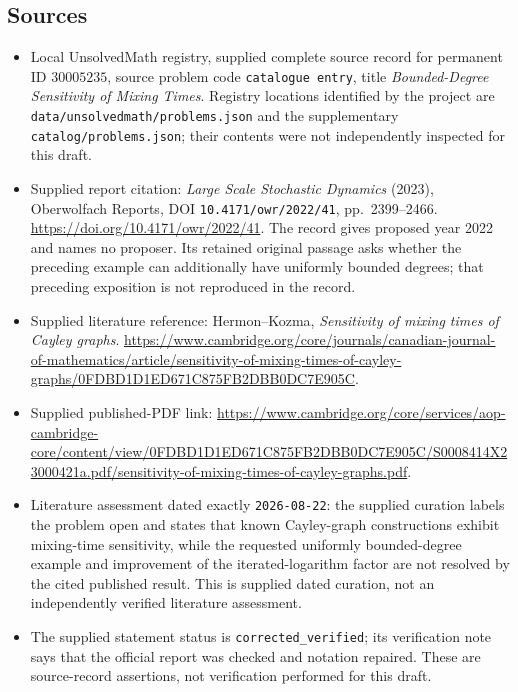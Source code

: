 \documentclass[11pt]{article}
\begin{document}
\subsection{Sources}
\begin{itemize}
\item Local UnsolvedMath registry, supplied complete source record for permanent ID \(30005235\), source problem code \texttt{catalogue entry}, title \emph{Bounded-Degree Sensitivity of Mixing Times}. Registry locations identified by the project are \texttt{data/unsolvedmath/problems.json} and the supplementary \texttt{catalog/problems.json}; their contents were not independently inspected for this draft.
\item Supplied report citation: \emph{Large Scale Stochastic Dynamics} (2023), Oberwolfach Reports, DOI \texttt{10.4171/owr/2022/41}, pp.\ 2399--2466. \url{https://doi.org/10.4171/owr/2022/41}. The record gives proposed year 2022 and names no proposer. Its retained original passage asks whether the preceding example can additionally have uniformly bounded degrees; that preceding exposition is not reproduced in the record.
\item Supplied literature reference: Hermon--Kozma, \emph{Sensitivity of mixing times of Cayley graphs}. \url{https://www.cambridge.org/core/journals/canadian-journal-of-mathematics/article/sensitivity-of-mixing-times-of-cayley-graphs/0FDBD1D1ED671C875FB2DBB0DC7E905C}.
\item Supplied published-PDF link: \url{https://www.cambridge.org/core/services/aop-cambridge-core/content/view/0FDBD1D1ED671C875FB2DBB0DC7E905C/S0008414X23000421a.pdf/sensitivity-of-mixing-times-of-cayley-graphs.pdf}.
\item Literature assessment dated exactly \texttt{2026-08-22}: the supplied curation labels the problem open and states that known Cayley-graph constructions exhibit mixing-time sensitivity, while the requested uniformly bounded-degree example and improvement of the iterated-logarithm factor are not resolved by the cited published result. This is supplied dated curation, not an independently verified literature assessment.
\item The supplied statement status is \texttt{corrected\_verified}; its verification note says that the official report was checked and notation repaired. These are source-record assertions, not verification performed for this draft.
\end{itemize}
\end{document}
